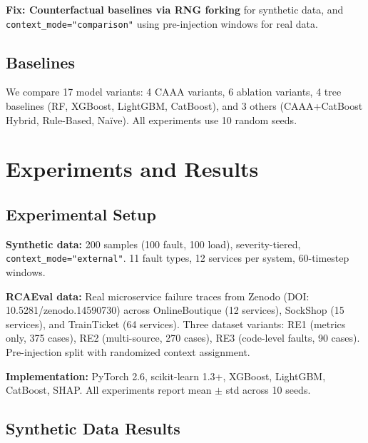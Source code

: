 \documentclass[12pt,a4paper]{report}
\begin{document}
\textbf{Fix: Counterfactual baselines via RNG forking} for synthetic data, and \texttt{context\_mode="comparison"} using pre-injection windows for real data.

\section{Baselines}

We compare 17 model variants: 4 CAAA variants, 6 ablation variants, 4 tree baselines (RF, XGBoost, LightGBM, CatBoost), and 3 others (CAAA+CatBoost Hybrid, Rule-Based, Na\"ive). All experiments use 10 random seeds.


\chapter{Experiments and Results}

\section{Experimental Setup}

\textbf{Synthetic data:} 200 samples (100 fault, 100 load), severity-tiered, \texttt{context\_mode="external"}. 11 fault types, 12 services per system, 60-timestep windows.

\textbf{RCAEval data:} Real microservice failure traces from Zenodo (DOI: 10.5281/zenodo.14590730) across OnlineBoutique (12 services), SockShop (15 services), and TrainTicket (64 services). Three dataset variants: RE1 (metrics only, 375 cases), RE2 (multi-source, 270 cases), RE3 (code-level faults, 90 cases). Pre-injection split with randomized context assignment.

\textbf{Implementation:} PyTorch 2.6, scikit-learn 1.3+, XGBoost, LightGBM, CatBoost, SHAP. All experiments report mean $\pm$ std across 10 seeds.

\section{Synthetic Data Results}
\end{document}
